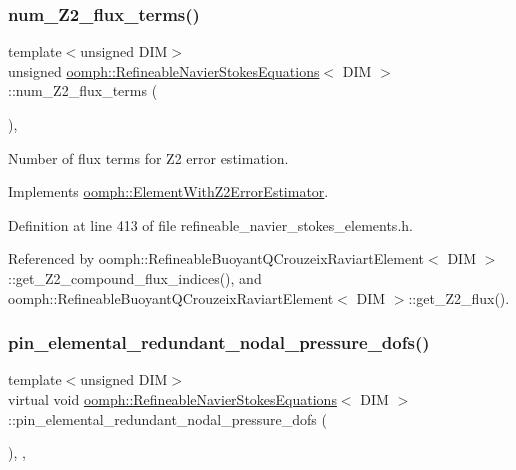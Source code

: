 \subsubsection{\texorpdfstring{num\+\_\+\+Z2\+\_\+flux\+\_\+terms()}{num\_Z2\_flux\_terms()}}
{\footnotesize\ttfamily template$<$unsigned D\+IM$>$ \\
unsigned \hyperlink{classoomph_1_1RefineableNavierStokesEquations}{oomph\+::\+Refineable\+Navier\+Stokes\+Equations}$<$ D\+IM $>$\+::num\+\_\+\+Z2\+\_\+flux\+\_\+terms (\begin{DoxyParamCaption}{ }\end{DoxyParamCaption})\hspace{0.3cm}{\ttfamily [inline]}, {\ttfamily [virtual]}}



Number of \textquotesingle{}flux\textquotesingle{} terms for Z2 error estimation. 



Implements \hyperlink{classoomph_1_1ElementWithZ2ErrorEstimator_ae82c5728902e13da31be19c390fc28e3}{oomph\+::\+Element\+With\+Z2\+Error\+Estimator}.



Definition at line 413 of file refineable\+\_\+navier\+\_\+stokes\+\_\+elements.\+h.



Referenced by oomph\+::\+Refineable\+Buoyant\+Q\+Crouzeix\+Raviart\+Element$<$ D\+I\+M $>$\+::get\+\_\+\+Z2\+\_\+compound\+\_\+flux\+\_\+indices(), and oomph\+::\+Refineable\+Buoyant\+Q\+Crouzeix\+Raviart\+Element$<$ D\+I\+M $>$\+::get\+\_\+\+Z2\+\_\+flux().

\mbox{\label{classoomph_1_1RefineableNavierStokesEquations_a5dbf8764b44554159043a45df312a7e3}} 
\subsubsection{\texorpdfstring{pin\+\_\+elemental\+\_\+redundant\+\_\+nodal\+\_\+pressure\+\_\+dofs()}{pin\_elemental\_redundant\_nodal\_pressure\_dofs()}}
{\footnotesize\ttfamily template$<$unsigned D\+IM$>$ \\
virtual void \hyperlink{classoomph_1_1RefineableNavierStokesEquations}{oomph\+::\+Refineable\+Navier\+Stokes\+Equations}$<$ D\+IM $>$\+::pin\+\_\+elemental\+\_\+redundant\+\_\+nodal\+\_\+pressure\+\_\+dofs (\begin{DoxyParamCaption}{ }\end{DoxyParamCaption})\hspace{0.3cm}{\ttfamily [inline]}, {\ttfamily [protected]}, {\ttfamily [virtual]}}



